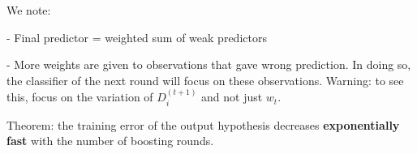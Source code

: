 We note:

- Final predictor = weighted sum of weak predictors

- More weights are given to observations that gave wrong prediction. In doing so, the classifier of the next round will focus on these observations. Warning: to see this, focus on the variation of $D^{(t+1)}_i$ and not just $w_t$.

\vspace{5mm}

Theorem: the training error of the output hypothesis decreases \textbf{exponentially fast} with the number of boosting rounds.

\vspace{5mm}